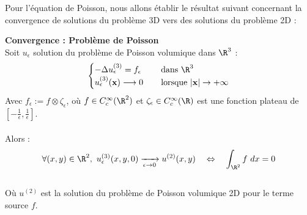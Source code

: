 Pour l'équation de Poisson, nous allons établir le résultat suivant concernant la convergence de solutions du problème 3D vers des solutions du problème 2D :
\begin{theorembox}
    \begin{theorem}
        \textbf{Convergence : Problème de Poisson} \\
        Soit $u_{\epsilon}$ solution du problème de Poisson volumique dans $\R^3$ :
        $$\begin{cases}
            -\Delta u^{(3)}_{\epsilon} = f_{\epsilon} \quad &\text{ dans } \R^3 \\
            u^{(3)}_{\epsilon}(\mathbf{x}) \longrightarrow 0 &\text{ lorsque } |\mathbf{x}| \to +\infty
        \end{cases}$$
        Avec $f_{\epsilon} := f \otimes \zeta_{\epsilon}$, où $f \in C^{\infty}_c(\R^2)$ et $\zeta_{\epsilon} \in C^{\infty}_c(\R)$ est une fonction plateau de $[-\frac{1}{\epsilon},\frac{1}{\epsilon}]$. \\
        \\
        Alors :
        $$\forall (x,y) \in \R^2, \ u^{(3)}_{\epsilon}(x,y,0) \xrightarrow[\epsilon \to 0]{} u^{(2)}(x,y) \quad \Leftrightarrow \quad \int_{\R^2} f \ dx = 0 $$ 
        \\
        Où $u^{(2)}$ est la solution du problème de Poisson volumique 2D pour le terme source $f$.
    \end{theorem}
\end{theorembox}
